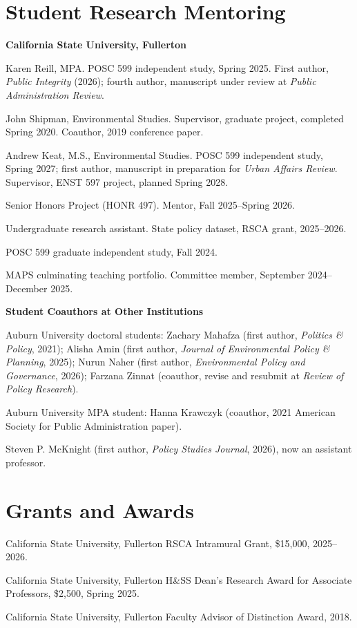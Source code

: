 \documentclass[12pt,letterpaper]{article}
\renewenvironment{itemize}{
  \begin{list}{}{
    \setlength{\leftmargin}{1.5em}
    \setlength{\itemsep}{0pt}\setlength{\topsep}{0pt}
    \setlength{\parskip}{0pt}
    \setlength{\parsep}{0.08em}
  }
}{
  \end{list}
}
\begin{document}
\section*{Student Research Mentoring}
\textbf{California State University, Fullerton}
\begin{itemize}\leftmargin=2pt\itemindent=-15pt
  \item Karen Reill, MPA. POSC 599 independent study, Spring 2025. First author, \emph{Public Integrity} (2026); fourth author, manuscript under review at \emph{Public Administration Review}.
  \item John Shipman, Environmental Studies. Supervisor, graduate project, completed Spring 2020. Coauthor, 2019 conference paper.
  \item Andrew Keat, M.S., Environmental Studies. POSC 599 independent study, Spring 2027; first author, manuscript in preparation for \emph{Urban Affairs Review}. Supervisor, ENST 597 project, planned Spring 2028.
  \item Senior Honors Project (HONR 497). Mentor, Fall 2025--Spring 2026.
  \item Undergraduate research assistant. State policy dataset, RSCA grant, 2025--2026.
  \item POSC 599 graduate independent study, Fall 2024.
  \item MAPS culminating teaching portfolio. Committee member, September 2024--December 2025.
\end{itemize}

\textbf{Student Coauthors at Other Institutions}
\begin{itemize}\leftmargin=2pt\itemindent=-15pt
  \item Auburn University doctoral students: Zachary Mahafza (first author, \emph{Politics \& Policy}, 2021); Alisha Amin (first author, \emph{Journal of Environmental Policy \& Planning}, 2025); Nurun Naher (first author, \emph{Environmental Policy and Governance}, 2026); Farzana Zinnat (coauthor, revise and resubmit at \emph{Review of Policy Research}).
  \item Auburn University MPA student: Hanna Krawczyk (coauthor, 2021 American Society for Public Administration paper).
  \item Steven P. McKnight (first author, \emph{Policy Studies Journal}, 2026), now an assistant professor.
\end{itemize}

\section*{Grants and Awards}
\begin{itemize}\leftmargin=2pt\itemindent=-15pt
  \item California State University, Fullerton RSCA Intramural Grant, \$15,000, 2025--2026.
  \item California State University, Fullerton H\&SS Dean's Research Award for Associate Professors, \$2,500, Spring 2025.
  \item California State University, Fullerton Faculty Advisor of Distinction Award, 2018.
\end{itemize}
\end{document}
